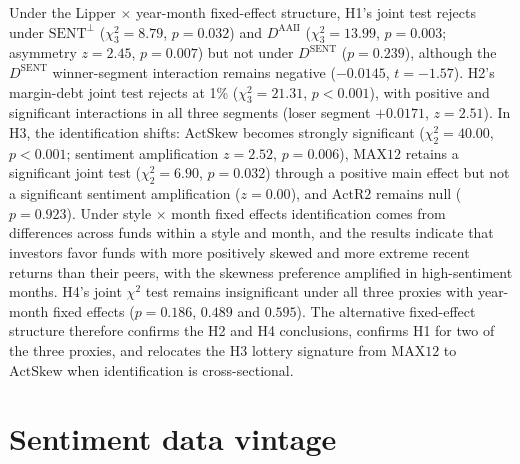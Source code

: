 \documentclass[12pt, oneside]{report}
\begin{document}








\noindent Under the Lipper $\times$ year-month fixed-effect structure,
H1's joint test rejects under $\text{SENT}^{\perp}$ ($\chi^2_3 = 8.79$,
$p = 0.032$) and $D^{\text{AAII}}$ ($\chi^2_3 = 13.99$, $p = 0.003$;
asymmetry $z = 2.45$, $p = 0.007$) but not under $D^{\text{SENT}}$
($p = 0.239$), although the $D^{\text{SENT}}$ winner-segment interaction
remains negative ($-0.0145$, $t = -1.57$). H2's margin-debt joint test
rejects at 1\% ($\chi^2_3 = 21.31$, $p < 0.001$), with positive and
significant interactions in all three segments (loser segment
$+0.0171$, $z = 2.51$). In H3, the identification shifts: $\text{ActSkew}$
becomes strongly significant ($\chi^2_2 = 40.00$, $p < 0.001$;
sentiment amplification $z = 2.52$, $p = 0.006$), $\text{MAX12}$ retains a
significant joint test ($\chi^2_2 = 6.90$, $p = 0.032$) through a positive
main effect but not a significant sentiment amplification ($z = 0.00$),
and $\text{ActR2}$ remains null ($p = 0.923$). Under style $\times$ month
fixed effects identification comes from differences across funds within
a style and month, and the results indicate that investors favor funds
with more positively skewed and more extreme recent returns than their
peers, with the skewness preference amplified in high-sentiment months.
H4's joint $\chi^2$ test remains insignificant under all three proxies
with year-month fixed effects ($p = 0.186$, $0.489$ and $0.595$). The
alternative fixed-effect structure therefore confirms the H2 and H4
conclusions, confirms H1 for two of the three proxies, and relocates the
H3 lottery signature from $\text{MAX12}$ to $\text{ActSkew}$ when
identification is cross-sectional.

\section{Sentiment data vintage}
\label{sec:sent_vintage}
\end{document}
